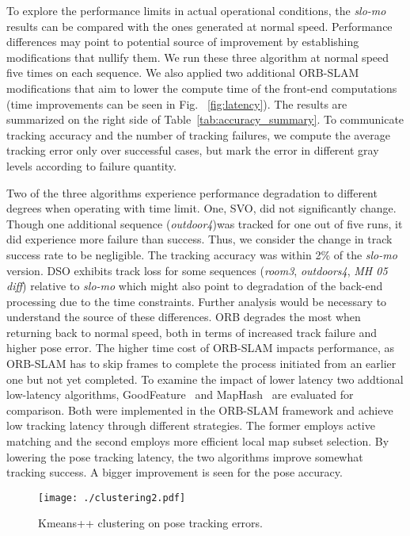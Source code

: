 To explore the performance limits in actual operational conditions, the
\textit{slo-mo} results can be compared with the ones generated at
normal speed. Performance differences may point to potential source of
improvement by establishing modifications that nullify them.
We run these three algorithm at normal speed five times on each sequence.
We also applied two additional ORB-SLAM modifications that aim to lower
the compute time of the front-end computations 
\cite{zhao2018good2,zhao2019maphash} (time improvements can be seen in
Fig.~ \ref{fig:latency}).  The results are summarized on the right side of 
Table~\ref{tab:accuracy_summary}. 
To communicate tracking accuracy and the number of tracking failures, 
we compute the average tracking error only over successful cases, but 
mark the error in different gray levels according to failure quantity. 

Two of the three algorithms experience performance degradation to different
degrees when operating with time limit. One, SVO, did not significantly
change.  Though one additional sequence (\textit{outdoor4})was tracked
for one out of five runs, it did experience more failure than success.
Thus, we consider the change in track success rate to be negligible. The
tracking accuracy was within 2\% of the \textit{slo-mo} version. DSO
exhibits track loss for some sequences 
(\textit{room3}, \textit{outdoors4}, \textit{MH 05 diff}) relative to
\textit{slo-mo} which might also point to degradation of the back-end
processing due to the time constraints.  Further analysis would be
necessary to understand the source of these differences.
ORB degrades the most when returning back to normal speed, both in terms
of increased track failure and higher pose error. The higher time cost
of ORB-SLAM impacts performance, as ORB-SLAM has to skip frames to
complete the process initiated from an earlier one but not yet completed.
To examine the impact of lower latency two addtional low-latency algorithms, 
GoodFeature~\cite{zhao2019tro} and MapHash~\cite{zhao2019maphash} are
evaluated for comparison. 
Both were implemented in the ORB-SLAM framework and achieve low tracking
latency through different strategies. The former employs active matching
and the second employs more efficient local map subset selection. 
By lowering the pose tracking latency, the two algorithms improve
somewhat tracking success. A bigger improvement is seen for the pose
accuracy.

\begin{figure}[!t]
	\centering
	\texttt{[image: ./clustering2.pdf]} \\
	\caption{Kmeans++ clustering on pose tracking errors.
 \label{fig:clustering}}
\end{figure}

